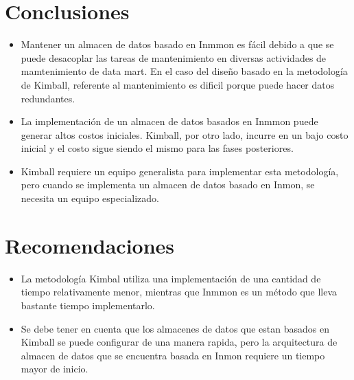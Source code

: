\documentclass[%
 reprint,
 amsmath,amssymb,
 aps,
]{revtex4-1}
\begin{document}
\section{Conclusiones}

\begin{itemize}
\item Mantener un almacen de datos basado en Inmmon es fácil debido a que se puede desacoplar las tareas de mantenimiento en diversas actividades de mamtenimiento de data mart. En el caso del diseño basado en la metodología de Kimball, referente al mantenimiento es dificil porque puede hacer datos redundantes.
\item La implementación de un almacen de datos basados en Inmmon puede generar altos costos iniciales. Kimball, por otro lado, incurre en un bajo costo inicial y el costo sigue siendo el mismo para las fases posteriores.
\item Kimball requiere un equipo generalista para implementar esta metodología, pero cuando se implementa un almacen de datos basado en Inmon, se necesita un equipo especializado.
\end{itemize}

\section{Recomendaciones}

\begin{itemize}
\item La metodología Kimbal utiliza una implementación de una cantidad de tiempo relativamente menor,  mientras que Inmmon es un método que lleva bastante tiempo implementarlo.
\item Se debe tener en cuenta que los almacenes de datos que estan basados en Kimball se puede configurar de una manera rapida, pero la arquitectura de almacen de datos que se encuentra basada en Inmon requiere un tiempo mayor de inicio.
\end{itemize}





\end{document}
